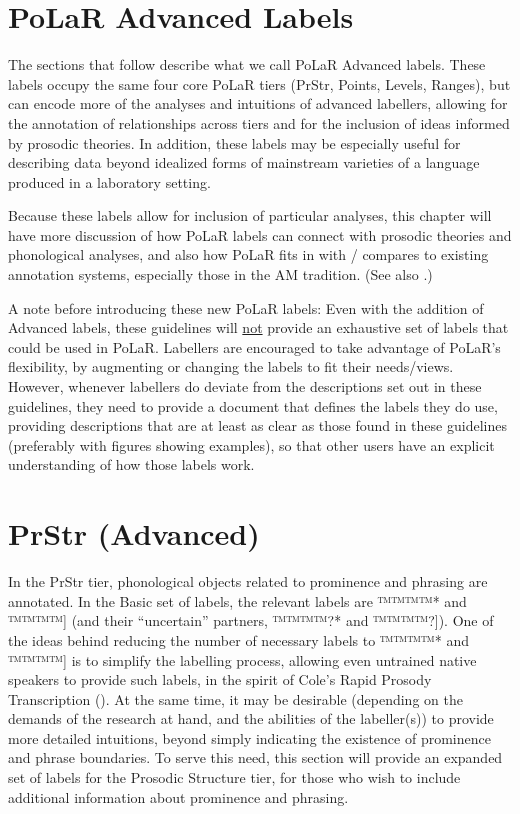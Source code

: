\documentclass[11pt, twoside]{memoir}
\begin{document}
\section{PoLaR Advanced Labels}\label{sec:polar-advanced-labels}

The sections that follow describe what we call PoLaR Advanced labels. These labels occupy the same four core PoLaR tiers (PrStr, Points, Levels, Ranges), but can encode more of the analyses and intuitions of advanced labellers, allowing for the annotation of relationships across tiers and for the inclusion of ideas informed by prosodic theories. In addition, these labels may be especially useful for describing data beyond idealized forms of mainstream varieties of a language produced in a laboratory setting.

Because these labels allow for inclusion of particular analyses, this chapter will have more discussion of how PoLaR labels can connect with prosodic theories and phonological analyses, and also how PoLaR fits in with / compares to existing annotation systems, especially those in the AM tradition. (See also \citealt{ahn-19}.)

A note before introducing these new PoLaR labels: Even with the addition of Advanced labels, these guidelines will \uline{not} provide an exhaustive set of labels that could be used in PoLaR. Labellers are encouraged to take advantage of PoLaR’s flexibility, by augmenting or changing the labels to fit their needs\slash views. However, whenever labellers do deviate from the descriptions set out in these guidelines, they need to provide a document that defines the labels they do use, providing descriptions that are at least as clear as those found in these guidelines (preferably with figures showing examples), so that other users have an explicit understanding of how those labels work.

\section{PrStr (Advanced)}\label{sec:prstr-advanced}

In the PrStr tier, phonological objects related to prominence and phrasing are annotated. In the Basic set of labels, the relevant labels are ™™™™{*} and ™™™™{]} (and their “uncertain” partners, ™™™™{?*} and ™™™™{?]}). One of the ideas behind reducing the number of necessary labels to ™™™™{*} and ™™™™{]} is to simplify the labelling process, allowing even untrained native speakers to provide such labels, in the spirit of Cole’s Rapid Prosody Transcription (\citealt{cole-14}). At the same time, it may be desirable (depending on the demands of the research at hand, and the abilities of the labeller(s)) to provide more detailed intuitions, beyond simply indicating the existence of prominence and phrase boundaries. To serve this need, this section will provide an expanded set of labels for the Prosodic Structure tier, for those who wish to include additional information about prominence and phrasing.
\end{document}
